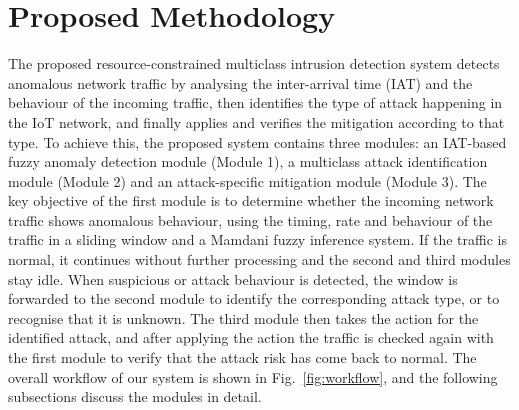 \documentclass[]{interact}
\theoremstyle{plain}%
\theoremstyle{definition}
\theoremstyle{remark}
\begin{document}
\section{Proposed Methodology}
The proposed resource-constrained multiclass intrusion detection system detects anomalous network traffic by analysing the inter-arrival time (IAT) and the behaviour of the incoming traffic, then identifies the type of attack happening in the IoT network, and finally applies and verifies the mitigation according to that type. To achieve this, the proposed system contains three modules: an IAT-based fuzzy anomaly detection module (Module 1), a multiclass attack identification module (Module 2) and an attack-specific mitigation module (Module 3). The key objective of the first module is to determine whether the incoming network traffic shows anomalous behaviour, using the timing, rate and behaviour of the traffic in a sliding window and a Mamdani fuzzy inference system. If the traffic is normal, it continues without further processing and the second and third modules stay idle. When suspicious or attack behaviour is detected, the window is forwarded to the second module to identify the corresponding attack type, or to recognise that it is unknown. The third module then takes the action for the identified attack, and after applying the action the traffic is checked again with the first module to verify that the attack risk has come back to normal. The overall workflow of our system is shown in Fig.~\ref{fig:workflow}, and the following subsections discuss the modules in detail.
\end{document}
